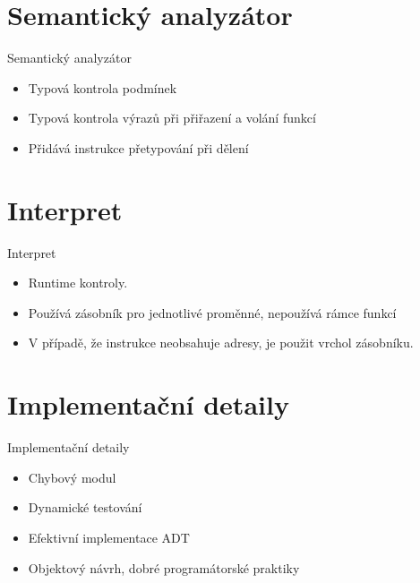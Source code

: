\documentclass{beamer}
\newenvironment{fitbox}[1]
  {\begin{beamerboxesrounded}[upper=upper,shadow=true]
  {#1}}
  {\end{beamerboxesrounded}}
\begin{document}
\section{Semantický analyzátor}
\begin{frame}
\begin{fitbox}{Semantický analyzátor}
\begin{itemize}
	\item Typová kontrola podmínek
	\item Typová kontrola výrazů při přiřazení a volání funkcí
	\item Přidává instrukce přetypování při dělení
\end{itemize}
\end{fitbox}
\end{frame}


\section{Interpret}
\begin{frame}
\begin{fitbox}{Interpret}
\begin{itemize}
	\item Runtime kontroly.
	\item Používá zásobník pro jednotlivé proměnné, nepoužívá rámce funkcí
	\item V případě, že instrukce neobsahuje adresy, je použit vrchol zásobníku.
\end{itemize}
\end{fitbox}
\end{frame}



\section{Implementační detaily}
\begin{frame}

\begin{fitbox}{Implementační detaily}
\begin{itemize}
	\item Chybový modul
	\item Dynamické testování
	\item Efektivní implementace ADT
	\item Objektový návrh, dobré programátorské praktiky
\end{itemize}
\end{fitbox}

\end{frame}
\end{document}
